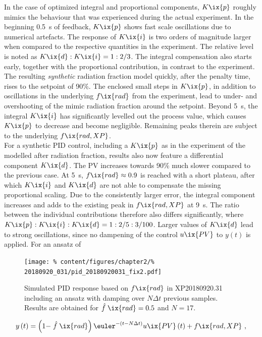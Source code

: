 %
            In the case of optimized integral and proportional components, $K\ix{p}$ roughly mimics the behaviour that was experienced during the actual experiment. In the beginning \SI{0.5}{\second} of feedback, $K\ix{p}$ shows fast scale oscillations due to numerical artefacts. The response of $K\ix{i}$ is two orders of magnitude larger when compared to the respective quantities in the experiment. The relative level is noted as $K\ix{d}:K\ix{i}=1:2/3$. The integral compensation also starts early, together with the proportional contribution, in contrast to the experiment. The resulting \textit{synthetic} radiation fraction model quickly, after the penalty time, rises to the setpoint of 90\%. The enclosed small steps in $K\ix{p}$, in addition to oscillations in the underlying $f\ix{rad}$ from the experiment, lead to under- and overshooting of the mimic radiation fraction around the setpoint. Beyond \SI{5}{\second}, the integral $K\ix{i}$ has significantly levelled out the process value, which causes $K\ix{p}$ to decrease and become negligible. Remaining peaks therein are subject to the underlying $f\ix{rad,XP}$.\\%
            For a synthetic PID control, including a $K\ix{p}$ as in the experiment of the modelled after radiation fraction, results also now feature a differential component $K\ix{d}$. The PV increases towards 90\% much slower compared to the previous case. At \SI{5}{\second}, $f\ix{rad}\approx0.9$ is reached with a short plateau, after which $K\ix{i}$ and $K\ix{d}$ are not able to compensate the missing proportional scaling. Due to the consistently larger error, the integral component increases and adds to the existing peak in $f\ix{rad,XP}$ at \SI{9}{\second}. The ratio between the individual contributions therefore also differs significantly, where $K\ix{p}:K\ix{i}:K\ix{d}=1:2/5:3/100$. Larger values of $K\ix{d}$ lead to strong oscillations, since no dampening of the control $u\ix{PV}$ to $y\left(t\right)$ is applied. For an ansatz of%
%
            \begin{figure}[t]%
                \centering%
                \texttt{[image: \%
                    content/figures/chapter2/\%
                    20180920\_031/pid\_20180920031\_fix2.pdf]}%
                \caption{Simulated PID response based on $f\ix{rad}$ in XP20180920.31 including an ansatz with damping over $N\Delta t$ previous samples. Results are obtained for $\mathrel{\hat{f}}\ix{rad}=0.5$ and $N=17$.}\label{fig:20180920.31_PID2}%
            \end{figure}%
%
            \begin{align}%
                y\left(t\right)=\left(1-\mathrel{\hat{f}}\ix{rad}\right)\euler^{-\left(t-N\Delta t\right)}u\ix{PV}\left(t\right)+f\ix{rad,XP}\,\,,\nonumber%
            \end{align}%
